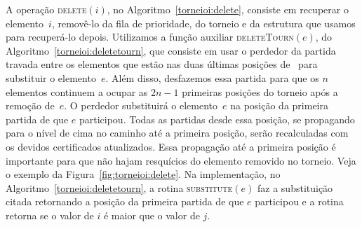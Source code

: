 





A operação \textsc{delete}$(i)$, no Algoritmo~\ref{torneioi:delete}, consiste em recuperar o
elemento~$i$, removê-lo da fila de prioridade, do torneio e da estrutura que usamos para
recuperá-lo depois.
Utilizamos a função auxiliar \textsc{deleteTourn}$(e)$, do Algoritmo~\ref{torneioi:deletetourn},
que consiste em usar o perdedor da partida travada entre os elementos que estão nas duas últimas
posições de \torneio~para substituir o elemento~$e$.
Além disso, desfazemos essa partida para que os $n$ elementos continuem a ocupar as $2n - 1$
primeiras posições do torneio após a remoção de~$e$.
O perdedor substituirá o elemento~$e$ na posição da primeira partida de que $e$ participou.
Todas as partidas desde essa posição, se propagando para o nível de cima no caminho até a primeira
posição, serão recalculadas com os devidos certificados atualizados.
Essa propagação até a primeira posição é importante para que não hajam resquícios do elemento
removido no torneio.
Veja o exemplo da Figura~\ref{fig:torneioi:delete}.
Na implementação, no Algoritmo~\ref{torneioi:deletetourn}, a rotina \textsc{substitute}$(e)$ faz a
substituição citada retornando a posição da primeira partida de que $e$ participou e a rotina
 retorna se o valor de $i$ é maior que o valor de $j$.






